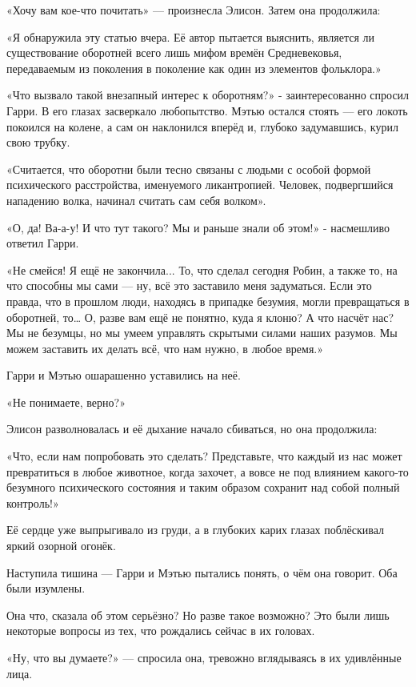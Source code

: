 \documentclass[a5paper, 9pt,
final, openany, twoside=true]{memoir}
\begin{document}
«Хочу вам кое-что почитать» — произнесла Элисон. Затем она продолжила:

«Я обнаружила эту статью вчера. Её автор пытается выяснить, является ли существование оборотней всего лишь мифом времён Средневековья, передаваемым из поколения в поколение как один из элементов фольклора.»\bigskip

«Что вызвало такой внезапный интерес к оборотням?» - заинтересованно спросил Гарри. В его глазах засверкало любопытство. Мэтью остался стоять — его локоть покоился на колене, а сам он наклонился вперёд и, глубоко задумавшись, курил свою трубку.

«Считается, что оборотни были тесно связаны с людьми с особой формой психического расстройства, именуемого ликантропией. Человек, подвергшийся нападению волка, начинал считать сам себя волком».

«О, да! Ва-а-у! И что тут такого? Мы и раньше знали об этом!» - насмешливо ответил Гарри.

«Не смейся! Я ещё не закончила... То, что сделал сегодня Робин, а также то, на что способны мы сами — ну, всё это заставило меня задуматься. Если это правда, что в прошлом люди, находясь в припадке безумия, могли превращаться в оборотней, то… О, разве вам ещё не понятно, куда я клоню? А что насчёт нас? Мы не безумцы, но мы умеем управлять скрытыми силами наших разумов. Мы можем заставить их делать всё, что нам нужно, в любое время.»

Гарри и Мэтью ошарашенно уставились на неё.

«Не понимаете, верно?»

Элисон разволновалась и её дыхание начало сбиваться, но она продолжила:

«Что, если нам попробовать это сделать? Представьте, что каждый из нас может превратиться в любое животное, когда захочет, а вовсе не под влиянием какого-то безумного психического состояния и таким образом сохранит над собой полный контроль!»\bigskip

Её сердце уже выпрыгивало из груди, а в глубоких карих глазах поблёскивал яркий озорной огонёк.

Наступила тишина — Гарри и Мэтью пытались понять, о чём она говорит. Оба были изумлены.

Она что, сказала об этом серьёзно? Но разве такое возможно? Это были лишь некоторые вопросы из тех, что рождались сейчас в их головах.

«Ну, что вы думаете?» — спросила она, тревожно вглядываясь в их удивлённые лица.
\end{document}

